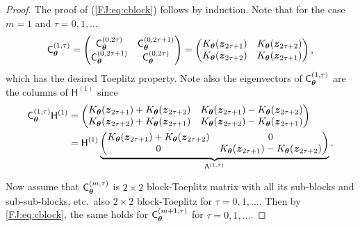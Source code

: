 \documentclass[graybox,footinfo]{svmult}
\begin{document}
\begin{proof}
    The proof of (\ref{FJ:eq:cblock}) follows by induction.  Note that for the case $m=1$ and $\tau = 0, 1, \ldots$
    \begin{equation*}
        \mathsf{C}_{{\boldsymbol{\theta}}}^{(1,\tau)} 
        = \begin{pmatrix} \mathsf{C}_{{\boldsymbol{\theta}}}^{(0, 2\tau)} & \mathsf{C}_{{\boldsymbol{\theta}}}^{(0,2 \tau+1)} \\
        	\mathsf{C}_{{\boldsymbol{\theta}}}^{(0,2 \tau+1)} & \mathsf{C}_{{\boldsymbol{\theta}}}^{(0,2 \tau)}
        \end{pmatrix}
        =  \begin{pmatrix}
        K_{\boldsymbol{\theta}}({\boldsymbol{z}}_{2 \tau+1}) & K_{\boldsymbol{\theta}}({\boldsymbol{z}}_{2 \tau+2}) \\
        K_{\boldsymbol{\theta}}({\boldsymbol{z}}_{2 \tau+2}) & K_{\boldsymbol{\theta}}({\boldsymbol{z}}_{2 \tau+1}) 
        \end{pmatrix} ,
    \end{equation*}
   which has the desired Toeplitz property. Note also the eigenvectors of $\mathsf{C}_{{\boldsymbol{\theta}}}^{(1,\tau)}$ are the columns of $\mathsf{H}^{(1)}$ since   
   \begin{align*}
        \mathsf{C}_{{\boldsymbol{\theta}}}^{(1,\tau)} \mathsf{H}^{(1)} & =  \begin{pmatrix}
        K_{\boldsymbol{\theta}}({\boldsymbol{z}}_{2 \tau+1}) + K_{\boldsymbol{\theta}}({\boldsymbol{z}}_{2 \tau+2}) & K_{\boldsymbol{\theta}}({\boldsymbol{z}}_{2 \tau+1}) - K_{\boldsymbol{\theta}}({\boldsymbol{z}}_{2 \tau+2})\\
        K_{\boldsymbol{\theta}}({\boldsymbol{z}}_{2 \tau+2}) + K_{\boldsymbol{\theta}}({\boldsymbol{z}}_{2 \tau+1}) &  K_{\boldsymbol{\theta}}({\boldsymbol{z}}_{2 \tau+2}) - K_{\boldsymbol{\theta}}({\boldsymbol{z}}_{2 \tau+1}) 
        \end{pmatrix} \\
        & = \mathsf{H}^{(1)} \underbrace{\begin{pmatrix}
        K_{\boldsymbol{\theta}}({\boldsymbol{z}}_{2 \tau+1}) + K_{\boldsymbol{\theta}}({\boldsymbol{z}}_{2 \tau+2}) & 0\\
        0 &   K_{\boldsymbol{\theta}}({\boldsymbol{z}}_{2 \tau+1}) - K_{\boldsymbol{\theta}}({\boldsymbol{z}}_{2 \tau+2})
        \end{pmatrix}}_{\mathsf{\Lambda}^{(1,\tau)}} .
    \end{align*}

   Now assume that $\mathsf{C}_{{\boldsymbol{\theta}}}^{(m,\tau)}$ is $2\times 2$ block-Toeplitz matrix with all its sub-blocks and sub-sub-blocks, etc.\ also $2\times 2$ block-Toeplitz for $\tau = 0, 1, \ldots$.  Then by \eqref{FJ:eq:cblock}, the same holds for $\mathsf{C}_{{\boldsymbol{\theta}}}^{(m+1,\tau)}$ for $\tau = 0, 1, \ldots$. 
   

\end{proof}
\end{document}
